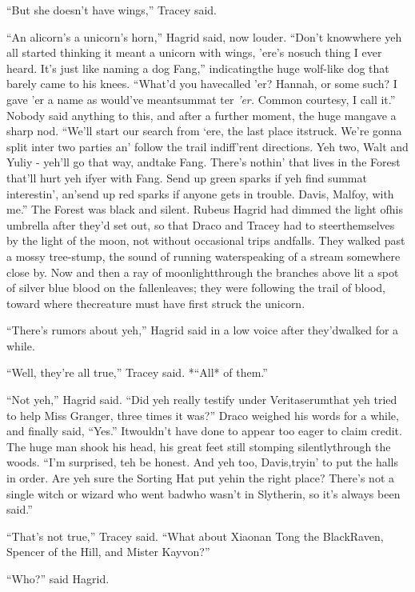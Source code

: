 ``But she doesn't have wings,'' Tracey said.

``An alicorn's a unicorn's horn,'' Hagrid said, now louder. ``Don't knowwhere yeh all started thinking it meant a unicorn with wings, 'ere's nosuch thing I ever heard. It's just like naming a dog Fang,'' indicatingthe huge wolf-like dog that barely came to his knees. ``What'd you havecalled 'er? Hannah, or some such? I gave 'er a name as would've meantsummat ter \emph{'er.} Common courtesy, I call it.''
Nobody said anything to this, and after a further moment, the huge mangave a sharp nod. ``We'll start our search from `ere, the last place itstruck. We're gonna split inter two parties an' follow the trail indiff'rent directions. Yeh two, Walt and Yuliy - yeh'll go that way, andtake Fang. There's nothin' that lives in the Forest that'll hurt yeh ifyer with Fang. Send up green sparks if yeh find summat interestin', an'send up red sparks if anyone gets in trouble. Davis, Malfoy, with me.''
The Forest was black and silent. Rubeus Hagrid had dimmed the light ofhis umbrella after they'd set out, so that Draco and Tracey had to steerthemselves by the light of the moon, not without occasional trips andfalls. They walked past a mossy tree-stump, the sound of running waterspeaking of a stream somewhere close by. Now and then a ray of moonlightthrough the branches above lit a spot of silver blue blood on the fallenleaves; they were following the trail of blood, toward where thecreature must have first struck the unicorn.

``There's rumors about yeh,'' Hagrid said in a low voice after they'dwalked for a while.

``Well, they're all true,'' Tracey said. *``All* of them.''

``Not yeh,'' Hagrid said. ``Did yeh really testify under Veritaserumthat yeh tried to help Miss Granger, three times it was?''
Draco weighed his words for a while, and finally said, ``Yes.'' Itwouldn't have done to appear too eager to claim credit.
The huge man shook his head, his great feet still stomping silentlythrough the woods. ``I'm surprised, teh be honest. And yeh too, Davis,tryin' to put the halls in order. Are yeh sure the Sorting Hat put yehin the right place? There's not a single witch or wizard who went badwho wasn't in Slytherin, so it's always been said.''

``That's not true,'' Tracey said. ``What about Xiaonan Tong the BlackRaven, Spencer of the Hill, and Mister Kayvon?''

``Who?'' said Hagrid.

